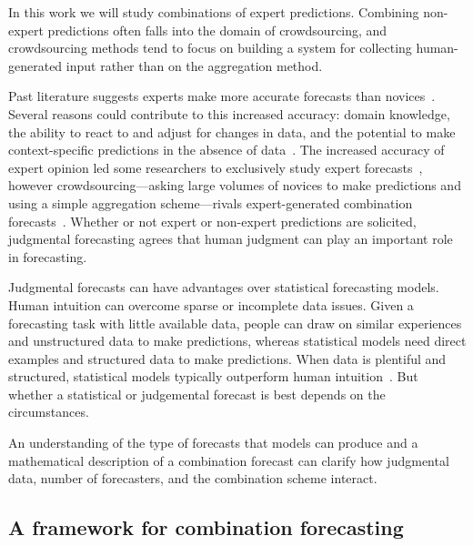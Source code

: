 \documentclass[preprint,authoryear]{elsarticle}
\begin{document}
In this work we will study combinations of expert predictions.
Combining non-expert predictions often falls into the domain of crowdsourcing, and crowdsourcing methods tend to focus on building a system for collecting human-generated input rather than on the aggregation method.

Past literature suggests experts make more accurate forecasts than novices~\citep{armstrong2001combining,armstrong1983relative,lawrence2006judgmental,spence1997moderating,alexander1995refining,french2011aggregating,clemen1999combining}.
Several reasons could contribute to this increased accuracy: domain knowledge, the ability to react to and adjust for changes in data, and the potential to make context-specific predictions in the absence of data~\citep{armstrong1983relative,lawrence2006judgmental,spence1997moderating,alexander1995refining}.
The increased accuracy of expert opinion led some researchers to exclusively study expert forecasts~\citep{armstrong2001combining,french2011aggregating,genre2013combining},
however crowdsourcing---asking large volumes of novices to make predictions and using a simple aggregation scheme---rivals expert-generated combination forecasts~\citep{howe2006rise,lintott2008galaxy,prill2011crowdsourcing}.
Whether or not expert or non-expert predictions are solicited, judgmental forecasting agrees that human judgment can play an important role in forecasting.

Judgmental forecasts can have advantages over statistical forecasting models. 
Human intuition can overcome sparse or incomplete data issues.
Given a forecasting task with little available data, people can draw on similar experiences and unstructured data to make predictions, whereas statistical models need direct examples and structured data to make predictions.
When data is plentiful and structured, statistical models typically outperform human intuition~\citep{meehl1954clinical,kleinmuntz1990we,yaniv1993judgmental}.
But whether a statistical or judgemental forecast is best depends on the circumstances. 

An understanding of the type of forecasts that models can produce and a mathematical description of a combination forecast can clarify how judgmental data, number of forecasters, and the combination scheme interact.

\subsection{A framework for combination forecasting}
\end{document}
